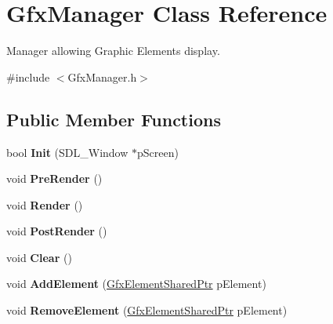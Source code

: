\hypertarget{classGfxManager}{\section{Gfx\-Manager Class Reference}
\label{classGfxManager}
}


Manager allowing Graphic Elements display.  




{\ttfamily \#include $<$Gfx\-Manager.\-h$>$}

\subsection*{Public Member Functions}
\begin{DoxyCompactItemize}
\item 
\hypertarget{classGfxManager_a6bd4ef18ed629b05bd9ef92eb8d32e96}{bool {\bfseries Init} (S\-D\-L\-\_\-\-Window $\ast$p\-Screen)}\label{classGfxManager_a6bd4ef18ed629b05bd9ef92eb8d32e96}

\item 
\hypertarget{classGfxManager_a9bd5181d94259c5749b22222682495be}{void {\bfseries Pre\-Render} ()}\label{classGfxManager_a9bd5181d94259c5749b22222682495be}

\item 
\hypertarget{classGfxManager_a83b8d191073e0f480ff8f91f77cd140f}{void {\bfseries Render} ()}\label{classGfxManager_a83b8d191073e0f480ff8f91f77cd140f}

\item 
\hypertarget{classGfxManager_a52d9b83d1a2c60a3595e01788bd326b5}{void {\bfseries Post\-Render} ()}\label{classGfxManager_a52d9b83d1a2c60a3595e01788bd326b5}

\item 
\hypertarget{classGfxManager_a3fa9b2f1614c33d144429d2743da5878}{void {\bfseries Clear} ()}\label{classGfxManager_a3fa9b2f1614c33d144429d2743da5878}

\item 
\hypertarget{classGfxManager_a82e774de0da85c1a081f9d87b73cd046}{void {\bfseries Add\-Element} (\hyperlink{GfxElement_8h_a3e248bc53ba4f9161edd41d1b31b6724}{Gfx\-Element\-Shared\-Ptr} p\-Element)}\label{classGfxManager_a82e774de0da85c1a081f9d87b73cd046}

\item 
\hypertarget{classGfxManager_ab2404b1d0dff262368a51b9709fd257b}{void {\bfseries Remove\-Element} (\hyperlink{GfxElement_8h_a3e248bc53ba4f9161edd41d1b31b6724}{Gfx\-Element\-Shared\-Ptr} p\-Element)}\label{classGfxManager_ab2404b1d0dff262368a51b9709fd257b}

\end{DoxyCompactItemize}


